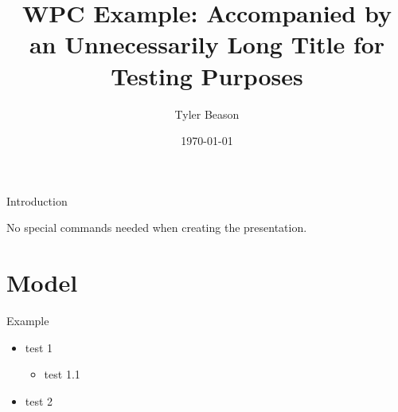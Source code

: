 \documentclass{beamer}
\title[WPC Example]{WPC Example: Accompanied by an Unnecessarily Long Title for Testing Purposes}
\author{Tyler Beason}
\institute[]{} %
\date{\today}
\begin{document}
\begin{frame}
\titlepage
\end{frame}


\begin{frame}{Introduction}

No special commands needed when creating the presentation.

\end{frame}

\section{Model}
\begin{frame}{Example}
	
\begin{itemize}
	\item test 1 
	\begin{itemize}
		\item test 1.1
	\end{itemize}
	\pause 
	\item test 2
\end{itemize}
	
\end{frame}

\end{document}
